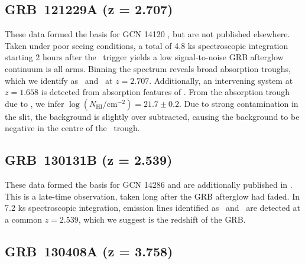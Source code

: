 \documentclass[longauth]{aa}    %
\begin{document}
%

\subsection{GRB~121229A (z = 2.707)} \label{121229}

These data formed the basis for GCN 14120 \citep{GCN14120}, but are not
published elsewhere. Taken under poor seeing conditions, a total of 4.8 ks
spectroscopic integration starting 2 hours after the \swift~trigger yields a low
signal-to-noise GRB afterglow continuum is all arms. Binning the spectrum
reveals broad absorption troughs, which we identify as \lyb~and \lya~at $z =
2.707$. Additionally, an intervening system at $z = 1.658$ is detected from
absorption features of \mgii. From the absorption trough due to \lya, we infer
$\log (N_{\mathrm{HI}}/\mathrm{cm}^{-2}) = 21.7 \pm 0.2$. Due to strong
contamination in the slit, the background is slightly over subtracted, causing
the background to be negative in the centre of the \lya~trough.

\subsection{GRB~130131B (z = 2.539)} \label{130131}

These data formed the basis for GCN 14286 \citep{GCN14286} and are additionally
published in \citet{Kruhler2015}. This is a late-time observation, taken long
after the GRB afterglow had faded. In 7.2 ks spectroscopic integration, emission
lines identified as \oii~and \oiii~are detected at a common $z = 2.539$, which
we suggest is the redshift of the GRB.

\subsection{GRB~130408A (z = 3.758)} \label{130408}
\end{document}
